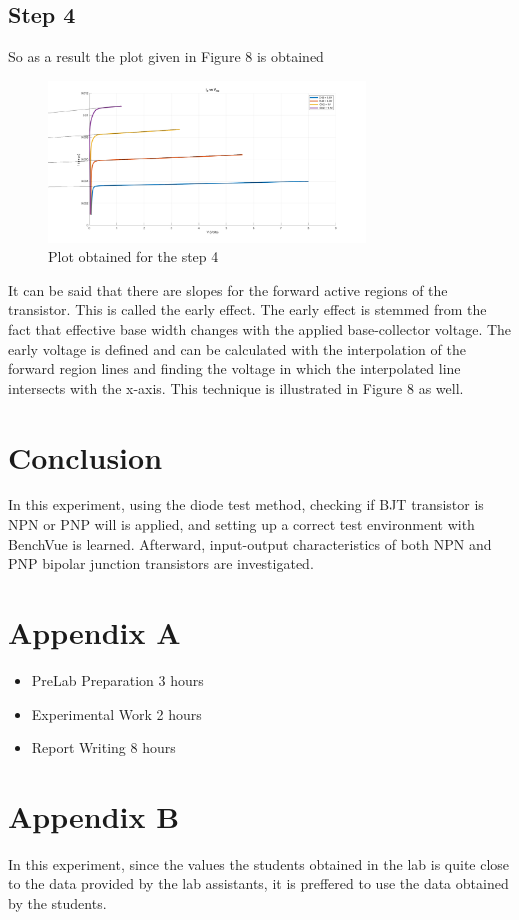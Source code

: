 \documentclass[letterpaper,12pt]{article}
\begin{document}
\subsection{Step 4}
So as a result the plot given in Figure 8 is obtained


\begin{figure}[H]
    \centering
    \includegraphics[width = 0.75\textwidth]{4_1.png}
    \caption{Plot obtained for the step 4}
    \end{figure} 

It can be said that there are slopes for the forward active regions of the transistor. This is called the early effect. The early effect is stemmed from the fact that effective base width changes with the applied base-collector voltage. The early voltage is defined and can be calculated with the interpolation of the forward region lines and finding the voltage in which the interpolated line intersects with the x-axis. This technique is illustrated in Figure 8 as well. 

\section{Conclusion}
In this experiment, using the diode test method, checking if BJT transistor is NPN or PNP will is applied, and setting up a correct test environment with BenchVue is learned. Afterward, input-output characteristics of both NPN and PNP bipolar junction transistors are investigated.

\section*{Appendix A}
\begin{itemize}
    \item PreLab Preparation 3 hours
    \item Experimental Work 2  hours
    \item Report Writing 8 hours
\end{itemize}
\section*{Appendix B}
In this experiment, since the values the students obtained in the lab is quite close to the data provided by the lab assistants, it is preffered to use the data obtained by the students.
\end{document}
